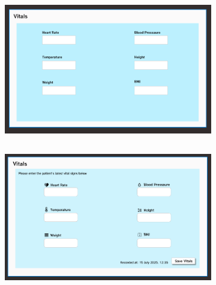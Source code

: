 \begin{figure}[H] %
  \centering
  \captionsetup[subfigure]{labelformat=simple, labelsep=space, justification=centering}
  \renewcommand{\thesubfigure}{(\alph{subfigure})}
  \begin{subfigure}[t]{0.48\linewidth}
    \centering
    \includegraphics[height=6cm]{images03/3-2-2-figure4a.png}
    \caption{}
    \label{fig:vitals-v1}
  \end{subfigure}\hfill
  \begin{subfigure}[t]{0.48\linewidth}
    \centering
    \includegraphics[height=6cm]{images03/3-2-2-figure4b.png}
    \caption{}
    \label{fig:vitals-v2}
  \end{subfigure}
\end{figure}
